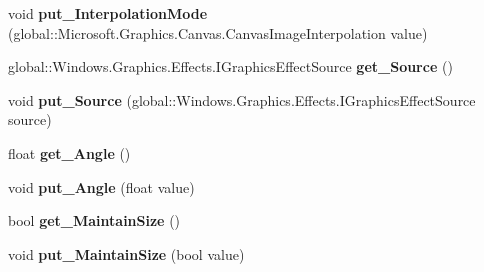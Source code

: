\begin{DoxyCompactItemize}
void {\bfseries put\+\_\+\+Interpolation\+Mode} (global\+::\+Microsoft.\+Graphics.\+Canvas.\+Canvas\+Image\+Interpolation value)
\item 
\mbox{\label{interface_microsoft_1_1_graphics_1_1_canvas_1_1_effects_1_1_i_straighten_effect_a24ea3cfd1f2bd3a3cff7beeb3a4788a4}} 
global\+::\+Windows.\+Graphics.\+Effects.\+I\+Graphics\+Effect\+Source {\bfseries get\+\_\+\+Source} ()
\item 
\mbox{\label{interface_microsoft_1_1_graphics_1_1_canvas_1_1_effects_1_1_i_straighten_effect_a70f0d6dc9433d17ebdcbe3a4b6b4892c}} 
void {\bfseries put\+\_\+\+Source} (global\+::\+Windows.\+Graphics.\+Effects.\+I\+Graphics\+Effect\+Source source)
\item 
\mbox{\label{interface_microsoft_1_1_graphics_1_1_canvas_1_1_effects_1_1_i_straighten_effect_a4420ccc230f5230df15709e5ac5d785a}} 
float {\bfseries get\+\_\+\+Angle} ()
\item 
\mbox{\label{interface_microsoft_1_1_graphics_1_1_canvas_1_1_effects_1_1_i_straighten_effect_ab42c88ed4087e8529feb2aad22332b17}} 
void {\bfseries put\+\_\+\+Angle} (float value)
\item 
\mbox{\label{interface_microsoft_1_1_graphics_1_1_canvas_1_1_effects_1_1_i_straighten_effect_a42af54b41b4e4299bb05315818ce7183}} 
bool {\bfseries get\+\_\+\+Maintain\+Size} ()
\item 
\mbox{\label{interface_microsoft_1_1_graphics_1_1_canvas_1_1_effects_1_1_i_straighten_effect_a0d1aa7dfd257a41c147868cb49446ea6}} 
void {\bfseries put\+\_\+\+Maintain\+Size} (bool value)
\item 
\mbox{\label{interface_microsoft_1_1_graphics_1_1_canvas_1_1_effects_1_1_i_straighten_effect_aea853ec4accf5f13bcfef15bd59e5170}} 

\end{DoxyCompactItemize}

